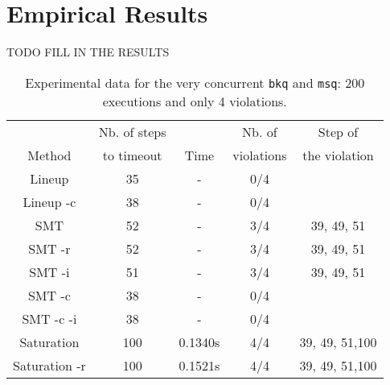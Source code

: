
\section{Empirical Results}
\label{sec:empirical}

TODO FILL IN THE RESULTS

\begin{table}[t]
  \footnotesize
  \centering
  \setlength{\tabcolsep}{1.8mm}
  \begin{tabular}{ccccc}
   & Nb. of steps  & & Nb. of & Step of  \\
   Method & to timeout & Time & violations & the violation \\
  \hline
  Lineup & 35 & - & 0/4 \\
  Lineup -c & 38 & - & 0/4 \\
  SMT & 52 & - & 3/4 & 39, 49, 51\\
  SMT -r & 52 & - & 3/4 & 39, 49, 51\\
  SMT -i & 51 & - & 3/4 & 39, 49, 51\\
  SMT -c & 38 & - & 0/4 \\
  SMT -c -i & 38 & - & 0/4 \\
  Saturation & 100 & 0.1340s & 4/4 & 39, 49, 51,100\\
  Saturation -r  & 100 & 0.1521s & 4/4 &39, 49, 51,100 
  \end{tabular} 
  \caption{Experimental data for the very concurrent {\tt bkq} and {\tt msq}: 200 executions and only 4 violations.
    }
  \label{tab:exp:static}
\end{table}


